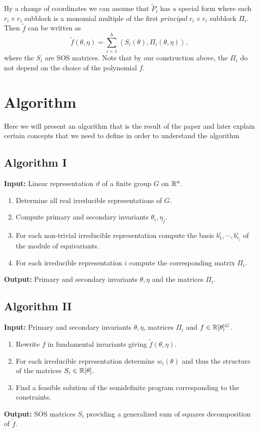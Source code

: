 \documentclass[]{article}
\begin{document}
By a change of coordinates we can assume that $\tilde{P}_i$ has a special form where each $r_i\times r_i$ subblock is a monomial multiple of the first \textit{principal} $r_i\times r_i$ subblock $\Pi_i$. Then $\tilde{f}$ can be written as 
\[
    \tilde{f}(\theta, \eta)=\sum_{i=1}^h\left<S_i(\theta),\Pi_i(\theta,\eta)\right>,
\]
where the $S_i$ are SOS matrices. %
Note that by our construction above, the $\Pi_i$ do not depend on the choice of the polynomial $f$.



\section{Algorithm}
Here we will present an algorithm that is the result of the paper and later explain certain concepts that we need to define in order to understand the algorithm

\subsection*{Algorithm I}


\textbf{Input:} Linear representation $\vartheta$ of a finite group $G$ on $\mathbb R^n$.

\begin{enumerate}
    \item Determine all real irreducible representations of $G$.
    \item Compute primary and secondary invariants $\theta_i,\eta_j$. 
    \item For each non-trivial irreducible representation compute the basis $b_1^i,\cdots, b_{r_i}^i$ of the module of equivariants.
    \item For each irreducible representation $i$ compute the corresponding matrix $\Pi_i$.
\end{enumerate}
\noindent
\textbf{Output:} Primary and secondary invariants $\theta,\eta$ and the matrices $\Pi_i$.

\subsection*{Algorithm II}

\textbf{Input: } Primary and secondary invariants $\theta,\eta$, matrices $\Pi_i$ and $f \in \mathbb R[\theta]^G$.

\begin{enumerate}
    \item Rewrite $f$ in fundamental invariants giving $\tilde{f}(\theta,\eta)$.
    \item For each irreducible representation determine $w_i(\theta)$ and thus the structure of the matrices $S_i\in \mathbb R[\theta]$. %
    \item Find a feasible solution of the semidefinite program corresponding to the constraints.
\end{enumerate}
\noindent
\textbf{Output:} SOS matrices $S_i$ providing a generalized sum of squares decomposition of $\tilde{f}$.\\
\end{document}
